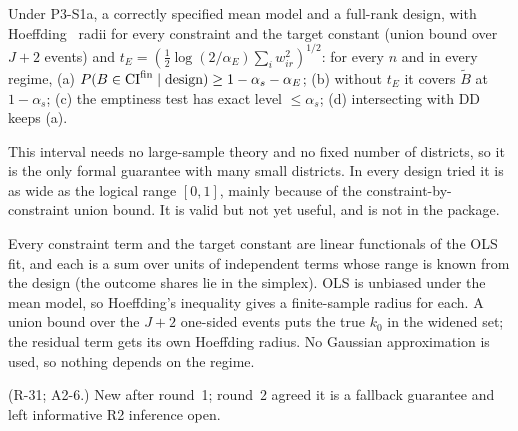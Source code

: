 \begin{result}\label{res:p38}
 Under P3-S1a, a correctly specified mean model and a full-rank
design, with Hoeffding~\citep{hoeffding1963} radii for every constraint and the target constant (union
bound over $J+2$ events) and $t_E=(\tfrac12\log(2/\alpha_E)\sum_iw_{ir}^2)^{1/2}$:
for every $n$ and in every regime, (a) $P(B\in\mathrm{CI}^{\rm fin}\mid\text{design})\ge1-\alpha_s-\alpha_E$;
(b) without $t_E$ it covers $\tilde B$ at $1-\alpha_s$; (c) the emptiness test has
exact level $\le\alpha_s$; (d) intersecting with DD keeps (a).
\end{result}
\begin{plain}
This interval needs no large-sample theory and no fixed number of districts, so it
is the only formal guarantee with many small districts. In every design tried it is
as wide as the logical range $[0,1]$, mainly because of the
constraint-by-constraint union bound. It is valid but not yet useful, and is not
in the package.
\end{plain}
\begin{sketch}
Every constraint term and the target constant are linear functionals of the OLS
fit, and each is a sum over units of independent terms whose range is known from
the design (the outcome shares lie in the simplex). OLS is unbiased under the
mean model, so Hoeffding's inequality gives a finite-sample radius for each. A
union bound over the $J+2$ one-sided events puts the true $k_0$ in the widened
set; the residual term gets its own Hoeffding radius. No Gaussian approximation
is used, so nothing depends on the regime.
\end{sketch}
\begin{revnote}(R-31; A2-6.) New after round~1; round~2 agreed it is a fallback guarantee and left informative R2 inference open.\end{revnote}

